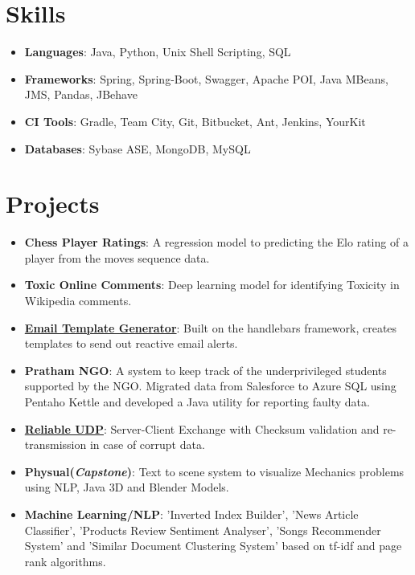 \documentclass[letterpaper,11pt]{article}
\newcommand{\resumeItem}[2]{
  \item\small{
    \textbf{#1}{: #2 \vspace{-2pt}}
  }
}
\newcommand{\resumeSubItem}[2]{\resumeItem{#1}{#2}\vspace{-4pt}}
\newcommand{\resumeSubHeadingListStart}{\begin{itemize}[leftmargin=*]}
\newcommand{\resumeSubHeadingListEnd}{\end{itemize}}
\begin{document}
\section{{\faGears} Skills}
 \resumeSubHeadingListStart
 \resumeSubItem{Languages}{Java, Python, Unix Shell Scripting, SQL}
 \resumeSubItem{Frameworks}{Spring, Spring-Boot, Swagger, Apache POI, Java MBeans, JMS, Pandas, JBehave}
 \resumeSubItem{CI Tools}{Gradle, Team City, Git, Bitbucket, Ant, Jenkins, YourKit}
 \resumeSubItem{Databases}{Sybase ASE, MongoDB, MySQL}
 \resumeSubHeadingListEnd

\section{{\faFlask} Projects}
  \resumeSubHeadingListStart
  \resumeSubItem{Chess Player Ratings} {A regression model to predicting the Elo rating of a player from the moves sequence data.
  }\resumeSubItem{Toxic Online Comments} {
  Deep learning model for identifying Toxicity in Wikipedia comments.
  }
  \resumeSubItem{\href{https://github.com/amanpreet692/HandleBarsEmailTemplate}
    {Email Template Generator}}
    {Built on the handlebars framework, creates templates to send out reactive email alerts.}
    \resumeSubItem{Pratham NGO}
      {A system to keep track of the  underprivileged students supported by the NGO. Migrated data from Salesforce to Azure SQL using Pentaho Kettle and developed a Java utility for reporting faulty data.}
    \resumeSubItem{\href{https://bitbucket.org/APS692/udp-with-error-detection} {Reliable UDP}}
      {Server-Client Exchange with Checksum validation and re-transmission in case of corrupt data.}
  \resumeSubItem{Physual(\textit{Capstone})}
      {Text to scene system to visualize Mechanics problems using NLP, Java 3D and Blender Models.}
\resumeSubItem{Machine Learning/NLP}
    {'Inverted Index Builder', 'News Article Classifier', 'Products Review Sentiment Analyser', 'Songs Recommender System' and 'Similar Document Clustering System' based on tf-idf and page rank algorithms.
    }      
  \resumeSubHeadingListEnd
\end{document}
